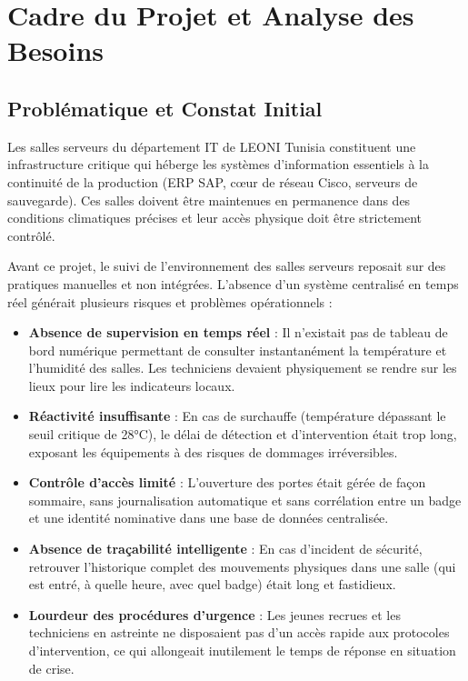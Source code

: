 \documentclass[12pt,a4paper]{report}
\begin{document}
\chapter{Cadre du Projet et Analyse des Besoins}

\section{Problématique et Constat Initial}
Les salles serveurs du département IT de LEONI Tunisia constituent une infrastructure critique qui héberge les systèmes d'information essentiels à la continuité de la production (ERP SAP, cœur de réseau Cisco, serveurs de sauvegarde). Ces salles doivent être maintenues en permanence dans des conditions climatiques précises et leur accès physique doit être strictement contrôlé.

Avant ce projet, le suivi de l'environnement des salles serveurs reposait sur des pratiques manuelles et non intégrées. L'absence d'un système centralisé en temps réel générait plusieurs risques et problèmes opérationnels :

\begin{itemize}
    \item \textbf{Absence de supervision en temps réel} : Il n'existait pas de tableau de bord numérique permettant de consulter instantanément la température et l'humidité des salles. Les techniciens devaient physiquement se rendre sur les lieux pour lire les indicateurs locaux.
    \item \textbf{Réactivité insuffisante} : En cas de surchauffe (température dépassant le seuil critique de 28°C), le délai de détection et d'intervention était trop long, exposant les équipements à des risques de dommages irréversibles.
    \item \textbf{Contrôle d'accès limité} : L'ouverture des portes était gérée de façon sommaire, sans journalisation automatique et sans corrélation entre un badge et une identité nominative dans une base de données centralisée.
    \item \textbf{Absence de traçabilité intelligente} : En cas d'incident de sécurité, retrouver l'historique complet des mouvements physiques dans une salle (qui est entré, à quelle heure, avec quel badge) était long et fastidieux.
    \item \textbf{Lourdeur des procédures d'urgence} : Les jeunes recrues et les techniciens en astreinte ne disposaient pas d'un accès rapide aux protocoles d'intervention, ce qui allongeait inutilement le temps de réponse en situation de crise.
\end{itemize}
\end{document}
